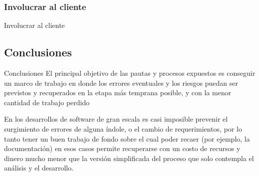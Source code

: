 \documentclass{beamer}
\begin{document}
\subsubsection{Involucrar al cliente}

\begin{frame}{Involucrar al cliente}

\end{frame}

\subsection{Conclusiones}
\begin{frame}{Conclusiones}
El principal objetivo de las pautas y procesos expuestos es conseguir un marco de trabajo en donde los errores eventuales y los riesgos puedan ser previstos y recuperados en la etapa más temprana posible, y con la menor cantidad de trabajo perdido

\vspace{1em}

En los desarrollos de software de gran escala es casi imposible prevenir el surgimiento de errores de alguna índole, o el cambio de requerimientos, por lo tanto tener un buen trabajo de fondo sobre el cual poder recaer (por ejemplo, la documentación) en esos casos permite recuperarse con un costo de recursos y dinero mucho menor que la versión simplificada del proceso que solo contempla el análisis y el desarrollo.
\end{frame}
\end{document}
